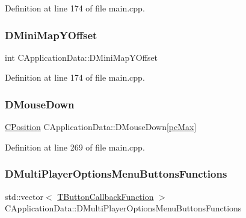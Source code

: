 Definition at line 174 of file main.\+cpp.

\hypertarget{classCApplicationData_ad33fc850bd8262a4bdf1f23e9477d5ad}{}\label{classCApplicationData_ad33fc850bd8262a4bdf1f23e9477d5ad} 
\subsubsection{\texorpdfstring{D\+Mini\+Map\+Y\+Offset}{DMiniMapYOffset}}
{\footnotesize\ttfamily int C\+Application\+Data\+::\+D\+Mini\+Map\+Y\+Offset\hspace{0.3cm}{\ttfamily [protected]}}



Definition at line 174 of file main.\+cpp.

\hypertarget{classCApplicationData_ad7a43a29e7906e44f09347850796a915}{}\label{classCApplicationData_ad7a43a29e7906e44f09347850796a915} 
\subsubsection{\texorpdfstring{D\+Mouse\+Down}{DMouseDown}}
{\footnotesize\ttfamily \hyperlink{classCPosition}{C\+Position} C\+Application\+Data\+::\+D\+Mouse\+Down\mbox{[}\hyperlink{GameDataTypes_8h_aafb0ca75933357ff28a6d7efbdd7602fa594a5c8dd3987f24e8a0f23f1a72cd34}{pc\+Max}\mbox{]}\hspace{0.3cm}{\ttfamily [protected]}}



Definition at line 269 of file main.\+cpp.

\hypertarget{classCApplicationData_ad32d3cc90fd1ead1574cb6c336257e1c}{}\label{classCApplicationData_ad32d3cc90fd1ead1574cb6c336257e1c} 
\subsubsection{\texorpdfstring{D\+Multi\+Player\+Options\+Menu\+Buttons\+Functions}{DMultiPlayerOptionsMenuButtonsFunctions}}
{\footnotesize\ttfamily std\+::vector$<$ \hyperlink{main_8cpp_af91bc223ea3fea871af009bfef33c595}{T\+Button\+Callback\+Function} $>$ C\+Application\+Data\+::\+D\+Multi\+Player\+Options\+Menu\+Buttons\+Functions\hspace{0.3cm}{\ttfamily [protected]}}




